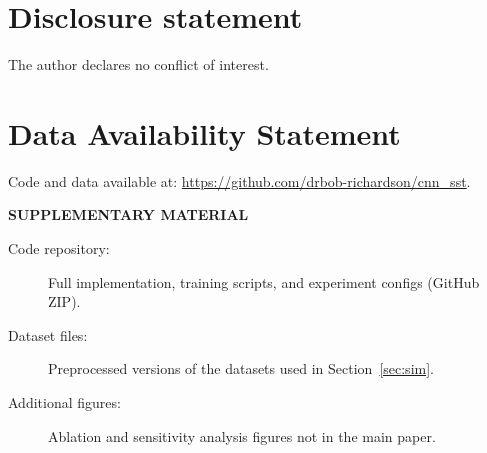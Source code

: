 \documentclass[12pt]{article}
\begin{document}
\section{Disclosure statement}\label{disclosure-statement}
The author declares no conflict of interest.

\section{Data Availability Statement}\label{data-availability-statement}
Code and data available at: \url{https://github.com/drbob-richardson/cnn_sst}.


\label{supplementary-material}
\bigskip
\begin{center}
  {\large\bf SUPPLEMENTARY MATERIAL}
\end{center}

\begin{description}
  \item[Code repository:] Full implementation, training scripts, and experiment configs (GitHub ZIP).
  \item[Dataset files:] Preprocessed versions of the datasets used in Section~\ref{sec:sim}.
  \item[Additional figures:] Ablation and sensitivity analysis figures not in the main paper.
\end{description}



\end{document}
